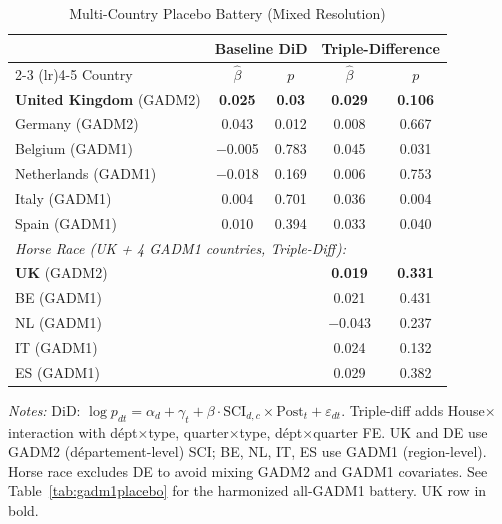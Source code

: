 \begin{table}[htbp]
\centering
\caption{Multi-Country Placebo Battery (Mixed Resolution)}
\label{tab:placebo}
\begin{threeparttable}
\begin{tabular}{lcccc}
\toprule
 & \multicolumn{2}{c}{Baseline DiD} & \multicolumn{2}{c}{Triple-Difference} \\
\cmidrule(lr){2-3} \cmidrule(lr){4-5}
Country & $\hat{\beta}$ & $p$ & $\hat{\beta}$ & $p$ \\
\midrule
\textbf{United Kingdom} (GADM2) & \textbf{0.025} & \textbf{0.03} & \textbf{0.029} & \textbf{0.106} \\
Germany (GADM2) & 0.043 & 0.012 & 0.008 & 0.667 \\
Belgium (GADM1) & $-$0.005 & 0.783 & 0.045 & 0.031 \\
Netherlands (GADM1) & $-$0.018 & 0.169 & 0.006 & 0.753 \\
Italy (GADM1) & 0.004 & 0.701 & 0.036 & 0.004 \\
Spain (GADM1) & 0.010 & 0.394 & 0.033 & 0.040 \\
\midrule
\multicolumn{5}{l}{\textit{Horse Race (UK + 4 GADM1 countries, Triple-Diff):}} \\
\quad \textbf{UK} (GADM2) & & & \textbf{0.019} & \textbf{0.331} \\
\quad BE (GADM1) & & & 0.021 & 0.431 \\
\quad NL (GADM1) & & & $-$0.043 & 0.237 \\
\quad IT (GADM1) & & & 0.024 & 0.132 \\
\quad ES (GADM1) & & & 0.029 & 0.382 \\
\bottomrule
\end{tabular}
\begin{tablenotes}[flushleft]\footnotesize
\item \textit{Notes:} DiD: $\log p_{dt} = \alpha_d + \gamma_t + \beta \cdot \text{SCI}_{d,c} \times \text{Post}_t + \varepsilon_{dt}$. Triple-diff adds House$\times$interaction with d\'{e}pt$\times$type, quarter$\times$type, d\'{e}pt$\times$quarter FE. UK and DE use GADM2 (d\'{e}partement-level) SCI; BE, NL, IT, ES use GADM1 (region-level). Horse race excludes DE to avoid mixing GADM2 and GADM1 covariates. See Table~\ref{tab:gadm1placebo} for the harmonized all-GADM1 battery. UK row in bold.
\end{tablenotes}
\end{threeparttable}
\end{table}
